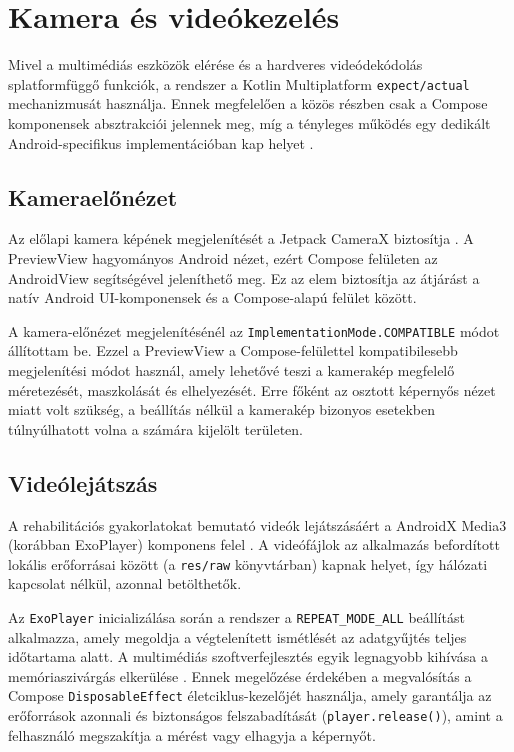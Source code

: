 \section{Kamera és videókezelés}

 Mivel a multimédiás eszközök elérése és a hardveres videódekódolás splatformfüggő funkciók,
 a rendszer a Kotlin Multiplatform \texttt{expect/actual} mechanizmusát használja.
Ennek megfelelően a közös részben csak a Compose komponensek absztrakciói jelennek meg,
míg a tényleges működés egy dedikált Android-specifikus implementációban kap helyet \cite{kotlinmultiplatform}.

\subsection{Kameraelőnézet}

Az előlapi kamera képének megjelenítését a Jetpack CameraX biztosítja \cite{camerax}.
A PreviewView hagyományos Android nézet, ezért Compose felületen az AndroidView segítségével
jeleníthető meg. Ez az elem biztosítja az átjárást a natív Android UI-komponensek és a Compose-alapú
felület között.

A kamera-előnézet megjelenítésénél az \texttt{ImplementationMode.COMPATIBLE} módot állítottam be.
Ezzel a PreviewView a Compose-felülettel kompatibilesebb megjelenítési módot használ,
amely lehetővé teszi a kamerakép megfelelő méretezését, maszkolását és elhelyezését.
Erre főként az osztott képernyős nézet miatt volt szükség, a beállítás nélkül a kamerakép bizonyos esetekben túlnyúlhatott volna a
számára kijelölt területen.

\subsection{Videólejátszás}

A rehabilitációs gyakorlatokat bemutató videók lejátszásáért a AndroidX Media3 (korábban ExoPlayer)
komponens felel \cite{exoplayer}. A videófájlok az alkalmazás befordított lokális erőforrásai között
(a \texttt{res/raw} könyvtárban) kapnak helyet, így hálózati kapcsolat nélkül, azonnal betölthetők.

Az \texttt{ExoPlayer} inicializálása során a rendszer a \texttt{REPEAT\_MODE\_ALL} beállítást alkalmazza,
amely megoldja a végtelenített ismétlését az adatgyűjtés teljes időtartama alatt.
A multimédiás szoftverfejlesztés egyik legnagyobb kihívása a memóriaszivárgás
elkerülése \cite{exoplayer}. Ennek megelőzése érdekében a megvalósítás a Compose
\texttt{DisposableEffect} életciklus-kezelőjét használja, amely garantálja az erőforrások azonnali
és biztonságos felszabadítását (\texttt{player.release()}), amint a felhasználó megszakítja a
mérést vagy elhagyja a képernyőt.
